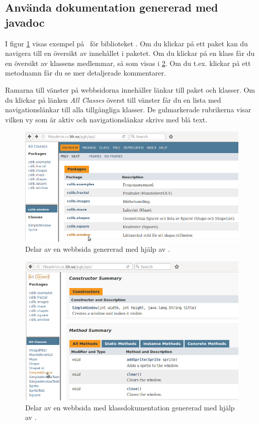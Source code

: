 \subsection{Använda dokumentation genererad med javadoc}

I figur \ref{fig:javadoc:overview} visas exempel på \javadoc\ för biblioteket . Om du klickar på ett paket kan du navigera till en översikt av innehållet i paketet. Om du klickar på en klass får du en översikt av klassens medlemmar, så som visas i \ref{fig:javadoc:class}.  Om du t.ex. klickar på ett metodnamn får du se mer detaljerade kommentarer. 

Ramarna till vänster på webbsidorna innehåller länkar till paket och klasser. Om du klickar på länken \textit{All Classes} överst till vänster får du en lista med navigationslänkar till alla tillgängliga klasser. De gulmarkerade rubrikerna visar vilken vy som är aktiv och navigationslänkar skrivs med blå text.

\begin{figure}
\includegraphics[width=1.0\textwidth]{../img/javadoc/javadoc-overview}
    \caption{Delar av en webbsida genererad med hjälp av \javadoc.}
    \label{fig:javadoc:overview}
\end{figure}



\begin{figure}
\includegraphics[width=1.0\textwidth]{../img/javadoc/javadoc-class}
    \caption{Delar av en webbsida med klassdokumentation genererad med hjälp av \javadoc.}
    \label{fig:javadoc:class}
\end{figure}






